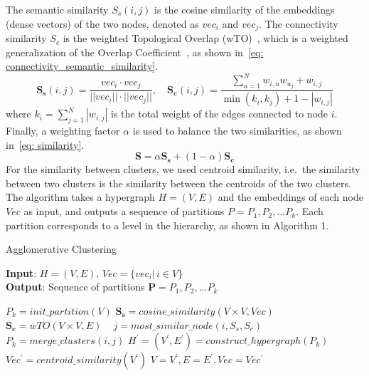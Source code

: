The semantic similarity $S_s(i, j)$ is the cosine similarity of the embeddings (dense vectors) of the two nodes, denoted as $vec_i$ and $vec_j$.
The connectivity similarity $S_c$ is the weighted Topological Overlap (wTO)~\cite{gysi2018wto},
which is a weighted generalization of the Overlap Coefficient~\cite{vijaymeena2016survey}, as shown in~\autoref{eq: connectivity_semantic_similarity}.
\begin{equation}\label{eq: connectivity_semantic_similarity}
    \mathbf{S_s}(i, j) = \frac{vec_i \cdot vec_j}{||vec_i|| \cdot ||vec_j||}, \quad
    \mathbf{S_c}(i, j) = \frac{\sum_{u=1}^N{w_{i,u}w_{u_j}} + w_{i,j}}{\min(k_i, k_j) + 1 - |w_{i,j}|}
\end{equation}
where $k_i = \sum_{j=1}^N |w_{i,j}|$ is the total weight of the edges connected to node $i$.
Finally, a weighting factor $\alpha$ is used to balance the two similarities, as shown in~\autoref{eq: similarity}.
\begin{equation}\label{eq: similarity}
    \mathbf{S} = \alpha \mathbf{S_s} + (1-\alpha) \mathbf{S_c}
\end{equation}
For the similarity between clusters, we used centroid similarity, i.e.\ the similarity between two clusters is the similarity between the centroids of the two clusters.
The algorithm takes a hypergraph $H=(V, E)$ and the embeddings of each node $Vec$ as input, and outputs a sequence of partitions $P=P_1, P_2, \dots P_k$.
Each partition corresponds to a level in the hierarchy, as shown in Algorithm 1.
\begin{algorithm}\label{alg: clustering}
    \caption{Agglomerative Clustering }\label{alg:cap}
    \hspace*{\algorithmicindent} \textbf{Input}: $H=(V, E)$, $Vec=\{vec_i |\, i \in V\}$ \\
    \hspace*{\algorithmicindent} \textbf{Output}: Sequence of partitions $\mathbf{P}=P_1, P_2, \dots P_k$ \\
    \begin{algorithmic}[1]
        \State$P_k = init\_partition(V)$ 
        \State$\mathbf{S_s} = cosine\_similarity(V\times V, Vec)$ 
        \State$\mathbf{S_c} = wTO(V\times V, E)$ \
            \State$j = most\_similar\_node(i, S_s, S_c)$ 
            \State$P_k = merge\_clusters(i, j)$ 
        \EndFor
        \State$H^\prime=(V^\prime, E^\prime) = construct\_hypergraph(P_k)$ 
        \State$Vec^\prime = centroid\_similarity(V^\prime)$
        \State$V=V^\prime, E=E^\prime, Vec=Vec^\prime$ 
    \EndWhile
    \end{algorithmic}
\end{algorithm}


